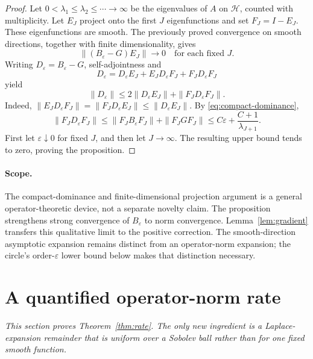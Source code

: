 \documentclass[11pt,a4paper]{article}
\theoremstyle{definition}\newtheorem{definition}[theorem]{Definition}
\theoremstyle{remark}\newtheorem{remark}[theorem]{Remark}
\begin{document}
\begin{proof}
Let $0<\lambda_1\le\lambda_2\le\cdots\to\infty$ be the
eigenvalues of $A$ on $\mathcal H$, counted with multiplicity.
Let $E_J$ project onto the first $J$ eigenfunctions and set
$F_J=I-E_J$.  These eigenfunctions are smooth.  The previously
proved convergence on smooth directions, together with finite
dimensionality, gives
\[
 \|(B_\varepsilon-G)E_J\|\longrightarrow0
 \quad\text{for each fixed }J.
\]
Writing $D_\varepsilon=B_\varepsilon-G$, self-adjointness and
\[
 D_\varepsilon
 =D_\varepsilon E_J+E_JD_\varepsilon F_J
   +F_JD_\varepsilon F_J
\]
yield
\[
 \|D_\varepsilon\|
 \le2\|D_\varepsilon E_J\|
      +\|F_JD_\varepsilon F_J\|.
\]
Indeed,
$\|E_JD_\varepsilon F_J\|
=\|F_JD_\varepsilon E_J\|\le\|D_\varepsilon E_J\|$.
By \eqref{eq:compact-dominance},
\[
 \|F_JD_\varepsilon F_J\|
 \le\|F_JB_\varepsilon F_J\|+\|F_JGF_J\|
 \le C\varepsilon+\frac{C+1}{\lambda_{J+1}}.
\]
First let $\varepsilon\downarrow0$ for fixed $J$, and then let
$J\to\infty$.  The resulting upper bound tends to zero, proving
the proposition.
\end{proof}

\paragraph{Scope.}
The compact-dominance and finite-dimensional projection argument is
a general operator-theoretic device, not a separate novelty claim.
The proposition strengthens strong convergence of $B_\varepsilon$
to norm convergence. Lemma~\ref{lem:gradient} transfers this qualitative limit to the positive correction. The smooth-direction asymptotic expansion remains distinct from an operator-norm expansion; the circle's order-$\varepsilon$ lower bound below makes that distinction necessary.

\section{A quantified operator-norm rate}\label{sec:rate}

\noindent\emph{This section proves Theorem~\ref{thm:rate}. The only new ingredient is a Laplace-expansion remainder that is uniform over a Sobolev ball rather than for one fixed smooth function.}
\end{document}
